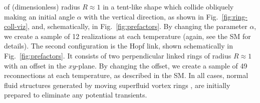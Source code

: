 \documentclass[9pt,twocolumn,twoside]{pnas-new}
\begin{document}
{of (dimensionless) radius $R\approx 1$ in a tent-like shape
which collide obliquely 
making an initial angle $\alpha$ with the vertical direction, 
as shown in Fig.~\ref{fig:ring-coll-viz}, and,
schematically, in Fig.~\ref{fig:prefactors}.   
By changing the parameter $\alpha$, we create a sample of 12 realizations
at each temperature (again, see the SM for details).
The second configuration is the Hopf link, shown schematically in Fig.~\ref{fig:prefactors}. It consists of two perpendicular linked rings of radius $R\approx1$ with an offset in the $xy$-plane.
By changing the offset, we create a sample of 49 reconnections
at each temperature, as described in the SM.
In all cases, normal fluid structures generated by moving superfluid vortex rings \cite{kivotides-barenghi-samuels-2000}, are initially prepared to eliminate any potential transients.
}

\showmatmethods{} %

\showacknow{} %

\bibsplit[21]
\end{document}
